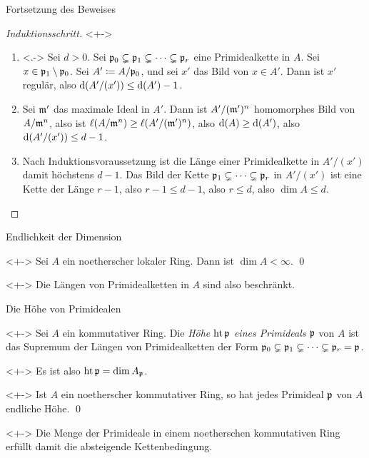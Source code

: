 \begin{frame}{Fortsetzung des Beweises}
	\begin{proof}[Induktionsschritt]<+->
		\begin{enumerate}[<+->]
		\item<.->
			Sei \(d > 0\). Sei \(\mathfrak{p}_0 \subsetneq \mathfrak{p}_1 \subsetneq \dotsb \subsetneq \mathfrak{p}_r\) eine
			Primidealkette in \(A\). Sei \(x \in \mathfrak{p}_1 \setminus \mathfrak{p}_0\). Sei \(A' \coloneqq A/\mathfrak{p}_0\),
			und sei \(x'\) das Bild von \(x \in A'\). Dann ist \(x'\) regulär,
			also \(\operatorname{d}(A'/(x')) \leq \operatorname{d}(A') - 1\).
		\item
			Sei \(\mathfrak{m}'\) das maximale Ideal in \(A'\). Dann ist \(A'/(\mathfrak{m}')^n\) homomorphes Bild von
			\(A/\mathfrak{m}^n\), also ist \(\ell(A/\mathfrak{m}^n) \ge \ell(A'/(\mathfrak{m}')^n)\), also \(\operatorname{d}(A) \ge \operatorname{d}(A')\),
			also \(\operatorname{d}(A'/(x')) \leq d - 1\).
		\item
			Nach Induktionsvoraussetzung ist die Länge einer Primidealkette in \(A'/(x')\) damit höchstens \(d - 1\). Das
			Bild der Kette \(\mathfrak{p}_1 \subsetneq \dotsb \subsetneq \mathfrak{p}_r\) in \(A'/(x')\) ist eine Kette der Länge
			\(r - 1\), also \(r - 1 \le d - 1\), also \(r \le d\), also \(\dim A \le d\).
		\qedhere
		\end{enumerate}
	\end{proof}
\end{frame}

\begin{frame}{Endlichkeit der Dimension}
	\begin{corollary}<+->
		Sei \(A\) ein noetherscher lokaler Ring. Dann ist \(\dim A < \infty\).
		\qed
	\end{corollary}
	\begin{visibleenv}<+->
		Die Längen von Primidealketten in \(A\) sind also beschränkt.
	\end{visibleenv}
\end{frame}

\begin{frame}{Die Höhe von Primidealen}
	\begin{definition}<+->
		Sei \(A\) ein kommutativer Ring. Die \emph{Höhe \(\operatorname{ht} \mathfrak{p}\) eines Primideals \(\mathfrak{p}\)} von
		\(A\) ist das Supremum der Längen von Primidealketten der Form \(\mathfrak{p}_0 \subsetneq \mathfrak{p}_1 \subsetneq
		\dotsb \subsetneq \mathfrak{p}_r = \mathfrak{p}\).
	\end{definition}
	\begin{visibleenv}<+->
		Es ist also \(\operatorname{ht} \mathfrak{p} = \dim A_{\mathfrak{p}}\).
	\end{visibleenv}
	\begin{corollary}<+->
		Ist \(A\) ein noetherscher kommutativer Ring, so hat jedes Primideal \(\mathfrak{p}\) von \(A\) endliche Höhe.
		\qed
	\end{corollary}
	\begin{visibleenv}<+->
		Die Menge der Primideale in einem noetherschen kommutativen Ring erfüllt damit die absteigende Kettenbedingung.
	\end{visibleenv}
\end{frame}

